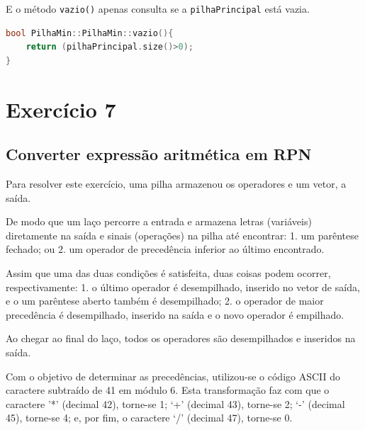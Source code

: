 \documentclass[
  brazilian,
  paper=a4,
  oneside  ,captions=tableheading
]{scrbook}
\newcommand{\passthrough}[1]{#1}
\begin{document}
E o método \passthrough{\lstinline!vazio()!} apenas consulta se a
\passthrough{\lstinline!pilhaPrincipal!} está vazia.

\begin{lstlisting}[language={C++}]
bool PilhaMin::PilhaMin::vazio(){
    return (pilhaPrincipal.size()>0);
}
\end{lstlisting}

\hypertarget{exercuxedcio-7}{%
\chapter{Exercício 7}\label{exercuxedcio-7}}

\hypertarget{converter-expressuxe3o-aritmuxe9tica-em-rpn}{%
\section{Converter expressão aritmética em
RPN}\label{converter-expressuxe3o-aritmuxe9tica-em-rpn}}

Para resolver este exercício, uma pilha armazenou os operadores e um
vetor, a saída.

De modo que um laço percorre a entrada e armazena letras (variáveis)
diretamente na saída e sinais (operações) na pilha até encontrar: 1. um
parêntese fechado; ou 2. um operador de precedência inferior ao último
encontrado.

Assim que uma das duas condições é satisfeita, duas coisas podem
ocorrer, respectivamente: 1. o último operador é desempilhado, inserido
no vetor de saída, e o um parêntese aberto também é desempilhado; 2. o
operador de maior precedência é desempilhado, inserido na saída e o novo
operador é empilhado.

Ao chegar ao final do laço, todos os operadores são desempilhados e
inseridos na saída.

Com o objetivo de determinar as precedências, utilizou-se o código ASCII
do caractere subtraído de 41 em módulo 6. Esta transformação faz com que
o caractere '*' (decimal 42), torne-se 1; `+' (decimal 43), torne-se 2;
`-' (decimal 45), torne-se 4; e, por fim, o caractere `/' (decimal 47),
torne-se 0.

\backmatter
\end{document}
